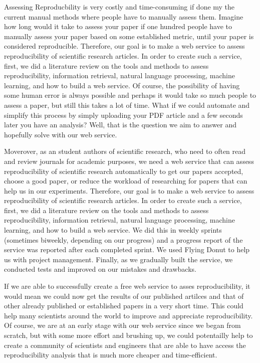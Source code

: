 \documentclass[
10pt, %
a4paper, %
oneside, %
headinclude,footinclude, %
BCOR5mm, %
]{scrartcl}
\begin{document}
Assessing Reproducbility is very costly and time-consuming if done my the current manual methods where people have to manually assess them. Imagine how long would it take to assess your paper if one hundred people have to manually assess your paper based on some established metric, until your paper is considered reproducible.
Therefore, our goal is to make a web service to assess reproducibility of scientific research  articles. In order to create such a service, first, we did a literature review on the tools and methods to assess reproducibility, information retrieval, natural language processing, machine learning, and how to build a web service.
Of course, the possibility of having some human error is always possible and perhaps it would take so much people to assess a paper, but still this takes a lot of time. What if we could automate and simplify this process by simply uploading your PDF article and a few seconds later you have an analysis?
Well, that is the question we aim to answer and hopefully solve with our web service. 

Moverover, as an student authors of scientific research, who need to often read and review journals for academic purposes, we need a web service that can assess reproducibility of scientific research automatically to get our papers accepted, choose a good paper, or reduce the workload of researching for papers that can help us in our experiments.
Therefore, our goal is to make a web service to assess reproducibility of scientific research  articles. In order to create such a service, first, we did a literature review on the tools and methods to assess reproducibility, information retrieval, natural language processing, machine learning, and how to build a web service.
We did this in weekly sprints (sometimes biweekly, depending on our progress) and a progress report of the service was reported after each completed sprint. We used Flying Donut to help us with project management. Finally, as we gradually built the service, we conducted tests and improved on our mistakes and drawbacks.
 

If we are able to successfully create a free web service to asses reproducibility, it would mean we could now get the results of our published artilces and that of other already published or established papers in a very short time. This could help many scientists around the world to improve and appreciate reproducibility. Of course, we are at an early stage with our web service since we began from scratch, but 
with some more effort and brushing up, we could potentailly help to create a community of scientists and engineers that are able to have access the reproducibility analysis that is much more cheaper and time-efficient. 
 
\end{document}
